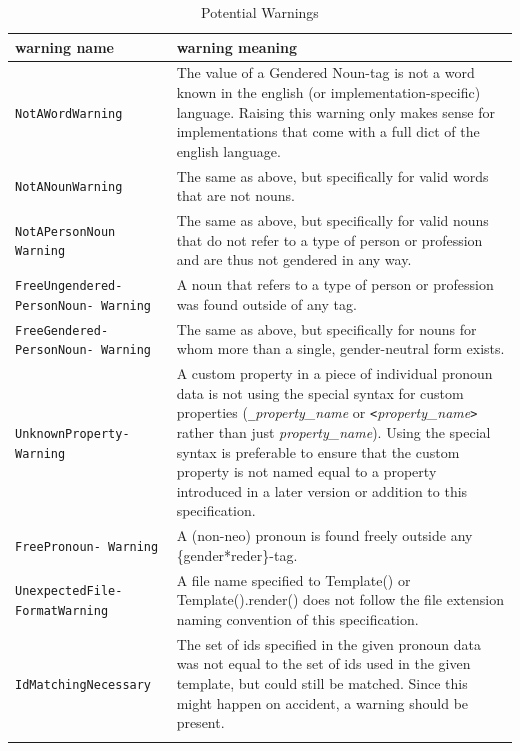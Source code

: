 \documentclass{article}
\begin{document}
    \begin{flushleft}
        \begin{center}
            \begin{longtable}{|>{\raggedright\arraybackslash}p{8em} | >{\raggedright\arraybackslash}p{28em} |}
                 \hline
                 warning name & warning meaning\\
                 \hline\hline
                 \texttt{NotAWordWarning} & The value of a Gendered Noun-tag is not a word known in the english (or implementation-specific) language.
                 Raising this warning only makes sense for implementations that come with a full dict of the english language.\\
                 \hline
                 \texttt{NotANounWarning} & The same as above, but specifically for valid words that are not nouns.\\
                 \hline
                 \texttt{NotAPersonNoun Warning} & The same as above, but specifically for valid nouns that do not refer to a type of person or profession and are thus not gendered in any way.\\
                 \hline
                 \texttt{FreeUngendered- PersonNoun- Warning} & A noun that refers to a type of person or profession was found outside of any tag.\\
                 \hline
                 \texttt{FreeGendered- PersonNoun- Warning} & The same as above, but specifically for nouns for whom more than a single, gender-neutral form exists.\\
                 \hline
                 \texttt{UnknownProperty- Warning} & A custom property in a piece of individual pronoun data is not using the special syntax for custom properties (\texttt{\_}\emph{property\_name} or \texttt{<}\emph{property\_name}\texttt{>} rather than just \emph{property\_name}).
                 Using the special syntax is preferable to ensure that the custom property is not named equal to a property introduced in a later version or addition to this specification.\\
                 \hline
                 \texttt{FreePronoun- Warning} & A (non-neo) pronoun is found freely outside any \{gender*reder\}-tag.\\
                 \hline
                 \texttt{UnexpectedFile- FormatWarning} & A file name specified to Template() or Template().render() does not follow the file extension naming convention of this specification.\\
                 \hline
                 \texttt{IdMatchingNecessary} & The set of ids specified in the given pronoun data was not equal to the set of ids used in the given template, but could still be matched.
                 Since this might happen on accident, a warning should be present.\\
                 \hline
                \caption{Potential Warnings}
            \end{longtable}
        \end{center}
    \end{flushleft}
\end{document}

